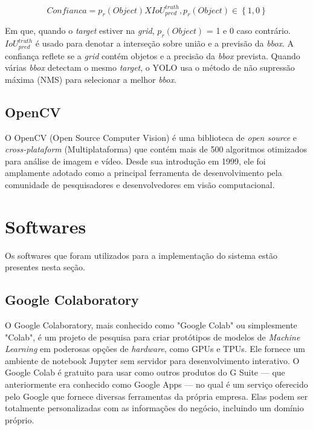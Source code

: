     

\[Confianca = p_r(Object) X IoU_{pred}^{truth} , p_r(Object) \in \left \{ 1\right.,\left.0\right \}\]

Em que, quando o \textit{target} estiver na \textit{grid}, \(p_r(Object)\) = 1 e 0 caso contrário. \(IoU_{pred}^{truth}\) é usado para denotar a interseção sobre união e a previsão da \textit{bbox}. A confiança reflete se a \textit{grid} contém objetos e a precisão da \textit{bbox} prevista. Quando várias \textit{bbox} detectam o mesmo \textit{target}, o YOLO usa o método de não supressão máxima (NMS) para selecionar a melhor \textit{bbox}.

\subsection{OpenCV}

O OpenCV (Open Source Computer Vision) é uma biblioteca de \textit{open source} e \textit{cross-plataform} (Multiplataforma) que contém mais de 500 algoritmos otimizados para análise de imagem e vídeo. Desde sua introdução em 1999, ele foi amplamente adotado como a principal ferramenta de desenvolvimento pela comunidade de pesquisadores e desenvolvedores em visão computacional.\cite{opencv}

\section{Softwares}
Os softwares que foram utilizados para a implementação do sistema estão presentes nesta seção.
\subsection{Google Colaboratory}
O Google Colaboratory, mais conhecido como "Google Colab" ou simplesmente "Colab", é um projeto de pesquisa para criar protótipos de modelos de \textit{Machine Learning} em poderosas opções de \textit{hardware}, como GPUs e TPUs. Ele fornece um ambiente de notebook Jupyter sem servidor para desenvolvimento interativo. O Google Colab é gratuito para usar como outros produtos do G Suite — que anteriormente era conhecido como Google Apps — no qual é um serviço oferecido pelo Google que fornece diversas ferramentas da própria empresa. Elas podem ser totalmente personalizadas com as informações do negócio, incluindo um domínio próprio.

